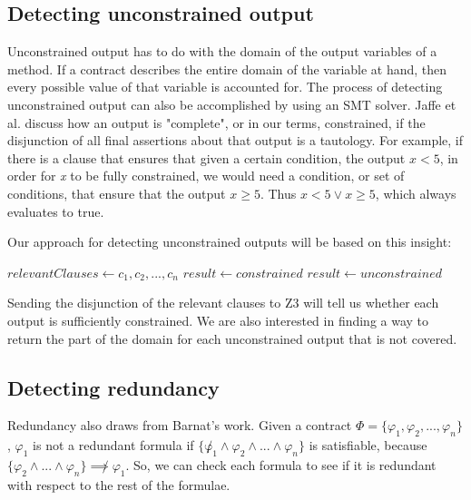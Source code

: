 \documentclass{article}
\newif\ifcomments
\newcommand{\egm}[1]{\ifcomments\textcolor{orange}{egm: #1}\fi}
\begin{document}
\subsection*{Detecting unconstrained output}

Unconstrained output has to do with the domain of the output variables of a method. If a contract describes the entire
domain of the variable at hand, then every possible value of that variable is accounted for. The process of detecting
unconstrained output can also be accomplished by using an SMT solver. Jaffe et al. \cite{jaffe1989completeness} discuss how
an output is "complete", or in our terms, constrained, if the disjunction of all final assertions about that output is a
tautology. For example, if there is a clause that ensures that given a certain condition, the output \(x < 5\), in order
for {\it x} to be fully constrained, we would need a condition, or set of conditions, that ensure that the output \(x \geq 5\).
Thus \(x < 5 \lor x \geq 5\), which always evaluates to true.

Our approach for detecting unconstrained outputs will be based on this insight:
\break

\begin{algorithmic}

    \State $relevantClauses \gets c_{1}, c_{2}, ..., c_{n}$ 
        \State $result \gets constrained$
    \Else
        \State $result \gets unconstrained$
    \EndIf
\EndFor

\end{algorithmic}

Sending the disjunction of the relevant clauses to Z3 will tell us whether each output is sufficiently constrained.
We are also interested in finding a way to return the part of the domain for each unconstrained output that
is not covered.
\egm{OK. Interesting. So if the ensures form a tautalogy then the output is constrained under every input? How do the pre-conditions factor in? It would have to be a tautology under the pre-condition constraints. Right? How is that logically stated?}

\subsection*{Detecting redundancy}

Redundancy also draws from Barnat's work. Given a contract \(\Phi = \{\varphi_{1}, \varphi_{2}, ..., \varphi_{n}\}\),
\(\varphi_{1}\) is not a redundant formula if \(\{\not \varphi_{1} \land \varphi_{2} \land ... \land \varphi_{n}\}\)
is satisfiable, because \(\{\varphi_{2} \land ... \land \varphi_{n}\} \not\implies \varphi_{1}\). So, we can check
each formula to see if it is redundant with respect to the rest of the formulae.
\egm{Look at logic minimization in the context of SMT. That would be really interesting. Construct the requires as a boolean predicate and then send that to the logic minimizer and reify it back into the original predicates.}
\end{document}
